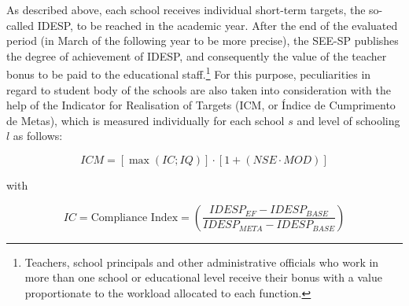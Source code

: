 \documentclass[a4paper, 12pt]{article}
\begin{document}



As described above, each school receives individual short-term targets, the so-called IDESP, to be reached in the academic year. After the end of the evaluated period (in March of the following year to be more precise), the SEE-SP publishes the degree of achievement of IDESP, and consequently the value of the teacher bonus to be paid to the educational staff.\footnote{Teachers, school principals and other administrative officials who work in more than one school or educational level receive their bonus with a value proportionate to the workload allocated to each function.} For this purpose, peculiarities in regard to student body of the schools are also taken into consideration with the help of the Indicator for Realisation of Targets (ICM, or Índice de Cumprimento de Metas), which is measured individually for each school $s$ and level of schooling $l$ as follows:








\begin{equation} \label{eq:ICM}
ICM = \left[\max{(IC;IQ)} \right] \cdot \left[1 +(NSE \cdot MOD) \right]
\end{equation}

with

\begin{equation} \label{eq:IC}
IC = \text{Compliance Index} = \left( \frac{IDESP_{EF} - IDESP_{BASE}}{IDESP_{META} - IDESP_{BASE}} \right)
\end{equation}
\end{document}
